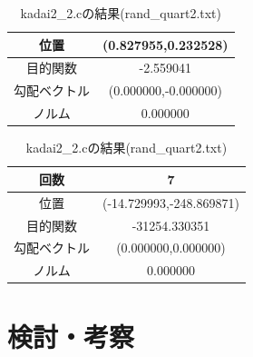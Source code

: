 \documentclass[12pt]{jarticle}
\begin{document}
\begin{table}[h]
\begin{center}
\begin{tabular}{|c|c|}
            \hline
            位置         & (0.827955,0.232528)  \\
            \hline
            目的関数     & -2.559041            \\
            \hline
            勾配ベクトル & (0.000000,-0.000000) \\
            \hline
            ノルム       & 0.000000             \\
            \hline
        \end{tabular}
        \caption{kadai2\_2.cの結果(rand\_quart2.txt)}
        \begin{tabular}{|c|c|}
            \hline
            回数         & 7                        \\
            \hline
            位置         & (-14.729993,-248.869871) \\
            \hline
            目的関数     & -31254.330351            \\
            \hline
            勾配ベクトル & (0.000000,0.000000)      \\
            \hline
            ノルム       & 0.000000                 \\
            \hline
        \end{tabular}
    \end{center}
\end{table}
\section{検討・考察}
\end{document}
